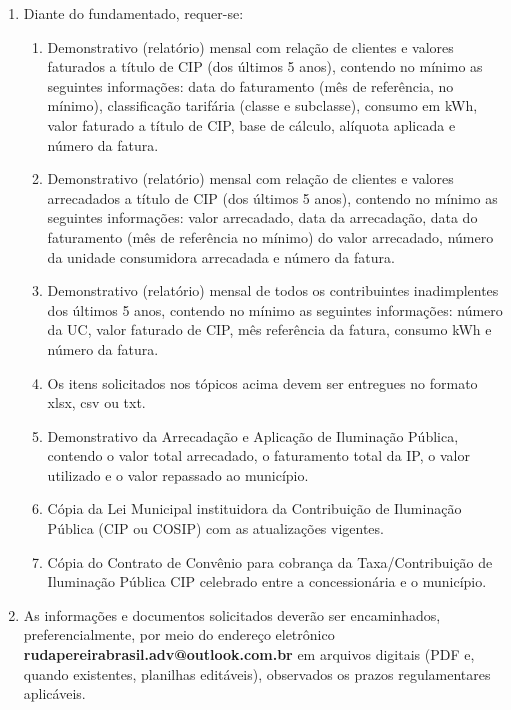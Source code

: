 \begin{enumerate}[resume]
  \item Diante do fundamentado, requer-se: 
    \begin{enumerate}
      \item Demonstrativo (relatório) mensal com relação de clientes e valores faturados a título de CIP (dos últimos 5 anos), contendo no mínimo as seguintes informações: data do faturamento (mês de referência, no mínimo), classificação tarifária (classe e subclasse), consumo em kWh, valor faturado a título de CIP, base de cálculo, alíquota aplicada e número da fatura.
      \item Demonstrativo (relatório) mensal com relação de clientes e valores arrecadados a título de CIP (dos últimos 5 anos), contendo no mínimo as seguintes informações: valor arrecadado, data da arrecadação, data do faturamento (mês de referência no mínimo) do valor arrecadado, número da unidade consumidora arrecadada e número da fatura.
      \item Demonstrativo (relatório) mensal de todos os contribuintes inadimplentes dos últimos 5 anos, contendo no mínimo as seguintes informações: número da UC, valor faturado de CIP, mês referência da fatura, consumo kWh e número da fatura. 
      \item Os itens solicitados nos tópicos acima devem ser entregues no formato xlsx, csv ou txt.
      \item Demonstrativo da Arrecadação e Aplicação de Iluminação Pública, contendo o valor total arrecadado, o faturamento total da IP, o valor utilizado e o valor repassado ao município.
      \item Cópia da Lei Municipal instituidora da Contribuição de Iluminação Pública (CIP ou COSIP) com as atualizações vigentes.
      \item Cópia do Contrato de Convênio para cobrança da Taxa/Contribuição de Iluminação Pública CIP celebrado entre a concessionária e o município.
    \end{enumerate}
  \item As informações e documentos solicitados deverão ser encaminhados, preferencialmente, por meio do endereço eletrônico \textbf{rudapereirabrasil.adv@outlook.com.br} em arquivos digitais (PDF e, quando existentes, planilhas editáveis), observados os prazos regulamentares aplicáveis.
\end{enumerate}





